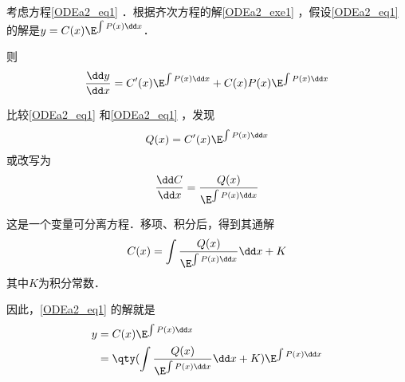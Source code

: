 \begin{example}{}
考虑方程\autoref{ODEa2_eq1} ．根据齐次方程的解\autoref{ODEa2_exe1} ，假设\autoref{ODEa2_eq1} 的解是$y=C(x)\E^{\int P(x)\dd x}$．

则
\begin{equation}
\begin{aligned}
\frac{\dd y}{\dd x}=C'(x)\E^{\int P(x)\dd x}+C(x)P(x)\E^{\int P(x)\dd x}
\end{aligned}
\end{equation}

比较\autoref{ODEa2_eq1} 和\autoref{ODEa2_eq1} ，发现
\begin{equation}
Q(x)=C'(x)\E^{\int P(x)\dd x}
\end{equation}
或改写为
\begin{equation}
\frac{\dd C}{\dd x}=\frac{Q(x)}{\E^{\int P(x)\dd x}}
\end{equation}

这是一个变量可分离方程．移项、积分后，得到其通解
\begin{equation}
C(x)=\int\frac{Q(x)}{\E^{\int P(x)\dd x}}\dd x+K
\end{equation}
其中$K$为积分常数．

因此，\autoref{ODEa2_eq1} 的解就是
\begin{equation}
\begin{aligned}
y&=C(x)\E^{\int P(x)\dd x}\\
&=\qty(\int\frac{Q(x)}{\E^{\int P(x)\dd x}}\dd x+K)\E^{\int P(x)\dd x}
\end{aligned}
\end{equation}
\end{example}















